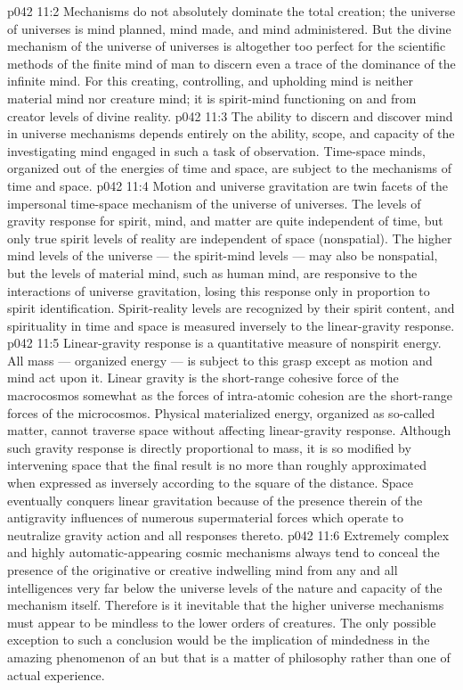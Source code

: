 \vs p042 11:2 \pc Mechanisms do not absolutely dominate the total creation; the universe of universes  is mind planned, mind made, and mind administered. But the divine mechanism of the universe of universes is altogether too perfect for the scientific methods of the finite mind of man to discern even a trace of the dominance of the infinite mind. For this creating, controlling, and upholding mind is neither material mind nor creature mind; it is spirit\hyp{}mind functioning on and from creator levels of divine reality.
\vs p042 11:3 The ability to discern and discover mind in universe mechanisms depends entirely on the ability, scope, and capacity of the investigating mind engaged in such a task of observation. Time\hyp{}space minds, organized out of the energies of time and space, are subject to the mechanisms of time and space.
\vs p042 11:4 \pc Motion and universe gravitation are twin facets of the impersonal time\hyp{}space mechanism of the universe of universes. The levels of gravity response for spirit, mind, and matter are quite independent of time, but only true spirit levels of reality are independent of space (nonspatial). The higher mind levels of the universe --- the spirit\hyp{}mind levels --- may also be nonspatial, but the levels of material mind, such as human mind, are responsive to the interactions of universe gravitation, losing this response only in proportion to spirit identification. Spirit\hyp{}reality levels are recognized by their spirit content, and spirituality in time and space is measured inversely to the linear\hyp{}gravity response.
\vs p042 11:5 Linear\hyp{}gravity response is a quantitative measure of nonspirit energy. All mass --- organized energy --- is subject to this grasp except as motion and mind act upon it. Linear gravity is the short\hyp{}range cohesive force of the macrocosmos somewhat as the forces of intra\hyp{}atomic cohesion are the short\hyp{}range forces of the microcosmos. Physical materialized energy, organized as so\hyp{}called matter, cannot traverse space without affecting linear\hyp{}gravity response. Although such gravity response is directly proportional to mass, it is so modified by intervening space that the final result is no more than roughly approximated when expressed as inversely according to the square of the distance. Space eventually conquers linear gravitation because of the presence therein of the antigravity influences of numerous supermaterial forces which operate to neutralize gravity action and all responses thereto.
\vs p042 11:6 \pc Extremely complex and highly automatic\hyp{}appearing cosmic mechanisms always tend to conceal the presence of the originative or creative indwelling mind from any and all intelligences very far below the universe levels of the nature and capacity of the mechanism itself. Therefore is it inevitable that the higher universe mechanisms must appear to be mindless to the lower orders of creatures. The only possible exception to such a conclusion would be the implication of mindedness in the amazing phenomenon of an  but that is a matter of philosophy rather than one of actual experience.
